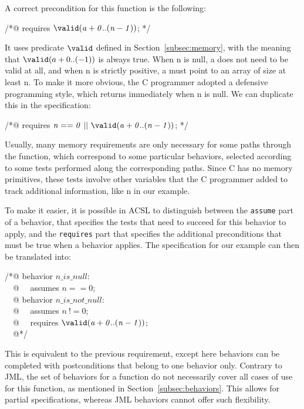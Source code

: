 \noindent
A correct precondition for this function is the following:

\begin{flushleft}\ttfamily
/*@ requires $\mathit{\texttt{{\textbackslash}valid}(a + 0..(n-1))}$; */
\end{flushleft}

It uses predicate $\texttt{{\textbackslash}valid}$ defined in Section~\ref{subsec:memory},
with the meaning that $\texttt{{\textbackslash}valid}(a + 0..(-1))$ is always true.
When {\ttfamily n} is null, {\ttfamily a} does
not need to be valid at all, and when {\ttfamily n} is strictly
positive, {\ttfamily a} must point to an array of size at least
{\ttfamily n}.  To make it more obvious, the C programmer adopted a
defensive programming style, which returns immediately when {\ttfamily n} is
null. We can duplicate this in the specification:

\begin{flushleft}\ttfamily
/*@ requires $\mathit{n == 0 ~||~ \texttt{{\textbackslash}valid}(a + 0..(n-1))}$; */
\end{flushleft}

Usually, many memory requirements are only necessary for some paths
through the function, which correspond to some particular
behaviors, selected according to some tests performed along the
corresponding paths. Since C has no memory
primitives, these tests involve other variables that the C programmer
added to track additional information, like {\ttfamily n} in our example.

To make it easier, it is possible in ACSL to distinguish between the
\verb|assume| part of a behavior, that specifies the tests that need
to succeed for this behavior to apply, and the \verb|requires| part
that specifies the additional preconditions that must be true when a
behavior applies. The specification for our example can then be
translated into: 

\begin{flushleft}\ttfamily
/*@ behavior $\mathit{n\_is\_null}$: \\
~~@ ~~assumes $\mathit{n == 0}$; \\
~~@ behavior $\mathit{n\_is\_not\_null}$: \\
~~@ ~~assumes $\mathit{n ~!= 0}$; \\
~~@ ~~requires $\mathit{\texttt{{\textbackslash}valid}(a + 0..(n-1))}$; \\
~~@*/
\end{flushleft}

This is equivalent to the previous requirement, except here behaviors
can be completed with postconditions that belong to one behavior only.
Contrary to JML, the set of behaviors for a function do not
necessarily cover all cases of use for this function, as mentioned in
Section~\ref{subsec:behaviors}. This allows for partial
specifications, whereas JML behaviors cannot offer such flexibility.


